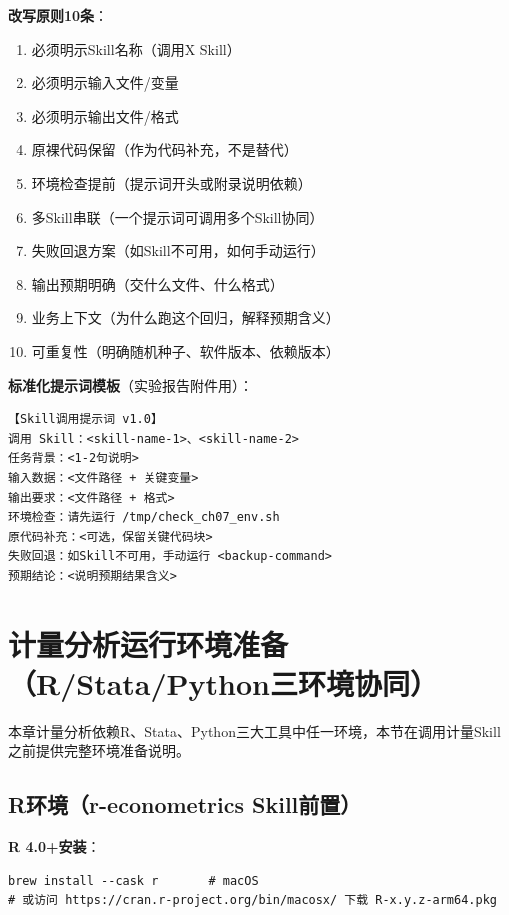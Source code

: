 \textbf{改写原则10条}：
\begin{enumerate}[leftmargin=2em]
  \item 必须明示Skill名称（调用X Skill）
  \item 必须明示输入文件/变量
  \item 必须明示输出文件/格式
  \item 原裸代码保留（作为代码补充，不是替代）
  \item 环境检查提前（提示词开头或附录说明依赖）
  \item 多Skill串联（一个提示词可调用多个Skill协同）
  \item 失败回退方案（如Skill不可用，如何手动运行）
  \item 输出预期明确（交什么文件、什么格式）
  \item 业务上下文（为什么跑这个回归，解释预期含义）
  \item 可重复性（明确随机种子、软件版本、依赖版本）
\end{enumerate}

\textbf{标准化提示词模板}（实验报告附件用）：
\begin{lstlisting}
【Skill调用提示词 v1.0】
调用 Skill：<skill-name-1>、<skill-name-2>
任务背景：<1-2句说明>
输入数据：<文件路径 + 关键变量>
输出要求：<文件路径 + 格式>
环境检查：请先运行 /tmp/check_ch07_env.sh
原代码补充：<可选，保留关键代码块>
失败回退：如Skill不可用，手动运行 <backup-command>
预期结论：<说明预期结果含义>
\end{lstlisting}

\section{计量分析运行环境准备（R/Stata/Python三环境协同）}


本章计量分析依赖R、Stata、Python三大工具中任一环境，本节在调用计量Skill之前提供完整环境准备说明。

\subsection{R环境（r-econometrics Skill前置）}

\textbf{R 4.0+安装}：
\begin{lstlisting}[style=shell]
brew install --cask r       # macOS
# 或访问 https://cran.r-project.org/bin/macosx/ 下载 R-x.y.z-arm64.pkg
\end{lstlisting}

